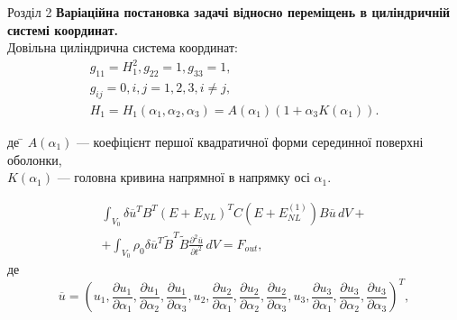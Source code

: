 \documentclass[8pt]{beamer}
\numberwithin{figure}{section}
\numberwithin{equation}{section}
\numberwithin{table}{section}
\begin{document}
\begin{frame}{Розділ 2}
\textbf{Варіаційна постановка задачі відносно переміщень в циліндричній системі координат.}\\
\vspace{1em}
Довільна циліндрична система координат:
\begin{equation}
\begin{gathered}
g_{11}=H_1^2, g_{22}=1, g_{33}=1, \\
g_{ij}=0, i,j=1,2,3, i \ne j,\\
H_1 = H_1 \left( \alpha_1, \alpha_2, \alpha_3 \right) = A \left( \alpha_1 \right) \left( 1+ \alpha_3 K \left( \alpha_1 \right) \right). 
\end{gathered}
\end{equation}

\begin{tabbing}
де \= $  A \left( \alpha_1 \right)$ --- коефіцієнт першої квадратичної форми серединної поверхні оболонки,\\
\> $K \left( \alpha_1 \right)$ --- головна кривина напрямної в напрямку осі $\alpha_1$.
\end{tabbing}

\begin{multline} \label{eq:virtwork_gen_u}
\int_{V_0} \delta\overline{u} ^T B ^T\left( E + E_{NL} \right)^T C \left( E + E_{NL}^{(1)} \right)B \overline{u} \, dV+\\+\int_{V_0} \rho_0 \delta\overline{u} ^T \tilde{B}^T \tilde{B}\frac{\partial^2 \overline{u}}{\partial t ^2}\,dV=F_{out},
\end{multline}
де
\begin{equation}
 \overline{u} =  \left( u_1,
\frac { \partial u_1 } { \partial \alpha_1}, 
\frac { \partial u_1 } { \partial \alpha_2}, 
\frac { \partial u_1 } { \partial \alpha_3}, 
u_2, 
\frac { \partial u_2 } { \partial \alpha_1},
\frac { \partial u_2 } { \partial \alpha_2}, 
\frac { \partial u_2 } { \partial \alpha_3}, 
u_3, 
\frac { \partial u_3 } { \partial \alpha_1}, 
\frac { \partial u_3 } { \partial \alpha_2}, 
\frac { \partial u_3 } { \partial \alpha_3}
\right)^T,
\end{equation}
\end{frame}
\end{document}
